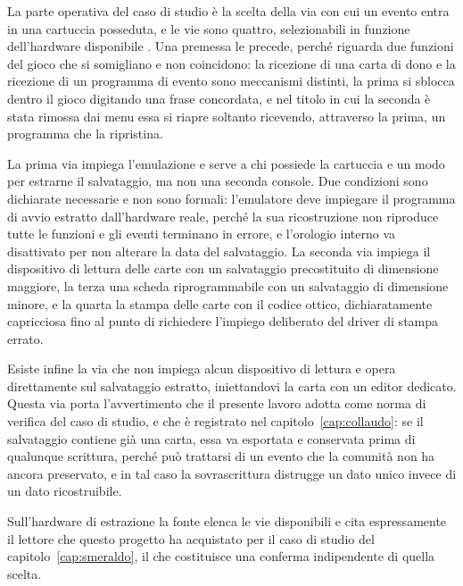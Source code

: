 La parte operativa del caso di studio è la scelta della via con cui un evento entra in una cartuccia posseduta, e le vie sono quattro, selezionabili in funzione dell'hardware disponibile \cite{video-ereader-eventi}. Una premessa le precede, perché riguarda due funzioni del gioco che si somigliano e non coincidono: la ricezione di una carta di dono e la ricezione di un programma di evento sono meccanismi distinti, la prima si sblocca dentro il gioco digitando una frase concordata, e nel titolo in cui la seconda è stata rimossa dai menu essa si riapre soltanto ricevendo, attraverso la prima, un programma che la ripristina.

La prima via impiega l'emulazione e serve a chi possiede la cartuccia e un modo per estrarne il salvataggio, ma non una seconda console. Due condizioni sono dichiarate necessarie e non sono formali: l'emulatore deve impiegare il programma di avvio estratto dall'hardware reale, perché la sua ricostruzione non riproduce tutte le funzioni e gli eventi terminano in errore, e l'orologio interno va disattivato per non alterare la data del salvataggio. La seconda via impiega il dispositivo di lettura delle carte con un salvataggio precostituito di dimensione maggiore, la terza una scheda riprogrammabile con un salvataggio di dimensione minore, e la quarta la stampa delle carte con il codice ottico, dichiaratamente capricciosa fino al punto di richiedere l'impiego deliberato del driver di stampa errato.

Esiste infine la via che non impiega alcun dispositivo di lettura e opera direttamente sul salvataggio estratto, iniettandovi la carta con un editor dedicato. Questa via porta l'avvertimento che il presente lavoro adotta come norma di verifica del caso di studio, e che è registrato nel capitolo~\ref{cap:collaudo}: se il salvataggio contiene già una carta, essa va esportata e conservata prima di qualunque scrittura, perché può trattarsi di un evento che la comunità non ha ancora preservato, e in tal caso la sovrascrittura distrugge un dato unico invece di un dato ricostruibile.

Sull'hardware di estrazione la fonte elenca le vie disponibili e cita espressamente il lettore che questo progetto ha acquistato per il caso di studio del capitolo~\ref{cap:smeraldo}, il che costituisce una conferma indipendente di quella scelta.

